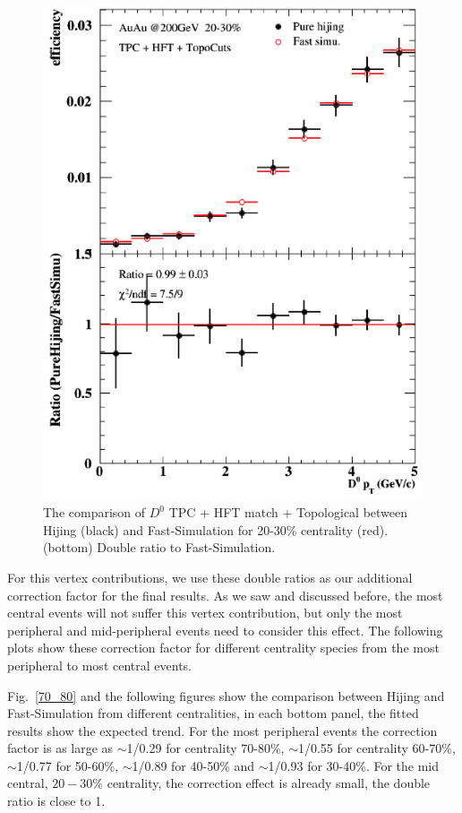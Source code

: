 \begin{figure}[htbp]
\begin{minipage}[htbp]{0.47\linewidth}
\includegraphics[width=1.0\textwidth,angle=0]{figure/Run14_D0HFT/20_30.png} 
\caption{ The comparison of $D^0$ TPC + HFT match + Topological between Hijing (black) and Fast-Simulation for 20-30\% centrality (red). (bottom) Double ratio to Fast-Simulation.\label{20_30}}
\end{minipage}
\end{figure}

For this vertex contributions, we use these double ratios as our additional correction factor for the final results. As we saw and discussed before, the most central events will not suffer this vertex contribution, but only the most peripheral and mid-peripheral events need to consider this effect. The following plots show these correction factor for different centrality species from the most peripheral to most central events.


Fig.~\ref{70_80} and the following figures show the comparison between Hijing and Fast-Simulation from different centralities, in each bottom panel, the fitted results show the expected trend. For the most peripheral events the correction factor is as large as $\sim$1/0.29 for centrality 70-80\%, $\sim$1/0.55 for centrality 60-70\%, $\sim$1/0.77 for 50-60\%, $\sim$1/0.89 for 40-50\% and $\sim$1/0.93 for 30-40\%. For the mid central, $20-30\%$ centrality, the correction effect is already small, the double ratio is close to 1. $ $

